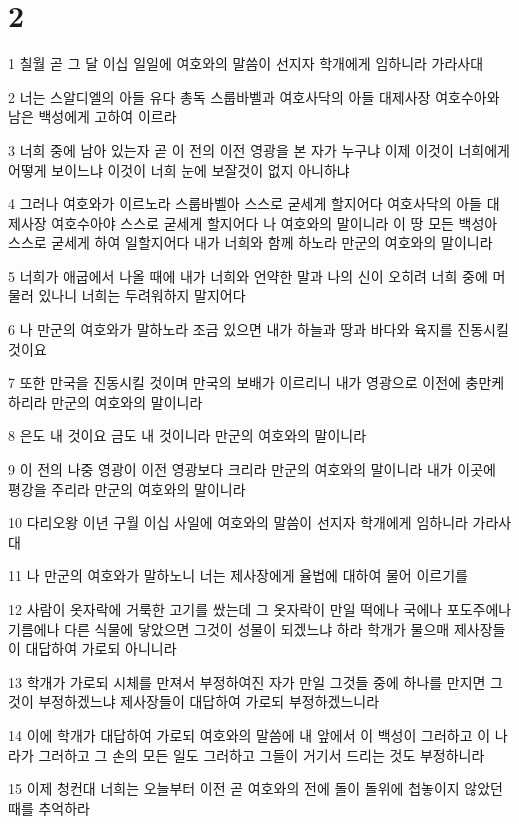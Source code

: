 \chapter{2}

\par 1 칠월 곧 그 달 이십 일일에 여호와의 말씀이 선지자 학개에게 임하니라 가라사대
\par 2 너는 스알디엘의 아들 유다 총독 스룹바벨과 여호사닥의 아들 대제사장 여호수아와 남은 백성에게 고하여 이르라
\par 3 너희 중에 남아 있는자 곧 이 전의 이전 영광을 본 자가 누구냐 이제 이것이 너희에게 어떻게 보이느냐 이것이 너희 눈에 보잘것이 없지 아니하냐
\par 4 그러나 여호와가 이르노라 스룹바벨아 스스로 굳세게 할지어다 여호사닥의 아들 대제사장 여호수아야 스스로 굳세게 할지어다 나 여호와의 말이니라 이 땅 모든 백성아 스스로 굳세게 하여 일할지어다 내가 너희와 함께 하노라 만군의 여호와의 말이니라
\par 5 너희가 애굽에서 나올 때에 내가 너희와 언약한 말과 나의 신이 오히려 너희 중에 머물러 있나니 너희는 두려워하지 말지어다
\par 6 나 만군의 여호와가 말하노라 조금 있으면 내가 하늘과 땅과 바다와 육지를 진동시킬 것이요
\par 7 또한 만국을 진동시킬 것이며 만국의 보배가 이르리니 내가 영광으로 이전에 충만케 하리라 만군의 여호와의 말이니라
\par 8 은도 내 것이요 금도 내 것이니라 만군의 여호와의 말이니라
\par 9 이 전의 나중 영광이 이전 영광보다 크리라 만군의 여호와의 말이니라 내가 이곳에 평강을 주리라 만군의 여호와의 말이니라
\par 10 다리오왕 이년 구월 이십 사일에 여호와의 말씀이 선지자 학개에게 임하니라 가라사대
\par 11 나 만군의 여호와가 말하노니 너는 제사장에게 율법에 대하여 물어 이르기를
\par 12 사람이 옷자락에 거룩한 고기를 쌌는데 그 옷자락이 만일 떡에나 국에나 포도주에나 기름에나 다른 식물에 닿았으면 그것이 성물이 되겠느냐 하라 학개가 물으매 제사장들이 대답하여 가로되 아니니라
\par 13 학개가 가로되 시체를 만져서 부정하여진 자가 만일 그것들 중에 하나를 만지면 그것이 부정하겠느냐 제사장들이 대답하여 가로되 부정하겠느니라
\par 14 이에 학개가 대답하여 가로되 여호와의 말씀에 내 앞에서 이 백성이 그러하고 이 나라가 그러하고 그 손의 모든 일도 그러하고 그들이 거기서 드리는 것도 부정하니라
\par 15 이제 청컨대 너희는 오늘부터 이전 곧 여호와의 전에 돌이 돌위에 첩놓이지 않았던 때를 추억하라
